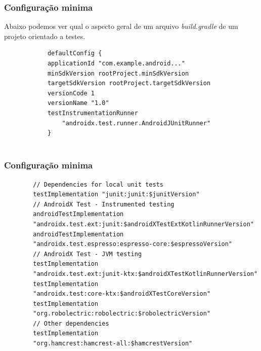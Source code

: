 \documentclass{beamer}
\begin{document}
\begin{frame} [fragile]
	\frametitle{Configuração minima}
	Abaixo podemos ver qual o aspecto geral de um arquivo \textit{build.gradle} de um projeto orientado a testes.
	\newline 
	\begin{example}
		\begin{lstlisting}
			defaultConfig {
			applicationId "com.example.android..."
			minSdkVersion rootProject.minSdkVersion
			targetSdkVersion rootProject.targetSdkVersion
			versionCode 1
			versionName "1.0"
			testInstrumentationRunner 
				"androidx.test.runner.AndroidJUnitRunner"
			}
			
		\end{lstlisting}
	\end{example}
	
\end{frame}

\begin{frame} [fragile]
	\frametitle{Configuração minima}
	
	\begin{example}
		\begin{lstlisting}
		// Dependencies for local unit tests
		testImplementation "junit:junit:$junitVersion"
		// AndroidX Test - Instrumented testing
		androidTestImplementation 
		"androidx.test.ext:junit:$androidXTestExtKotlinRunnerVersion"
		androidTestImplementation 
		"androidx.test.espresso:espresso-core:$espressoVersion"
		// AndroidX Test - JVM testing
		testImplementation 
		"androidx.test.ext:junit-ktx:$androidXTestKotlinRunnerVersion"
		testImplementation 
		"androidx.test:core-ktx:$androidXTestCoreVersion"
		testImplementation 
		"org.robolectric:robolectric:$robolectricVersion"
		// Other dependencies
		testImplementation 
		"org.hamcrest:hamcrest-all:$hamcrestVersion"
		
		\end{lstlisting}
	\end{example}
	
\end{frame}
\end{document}
